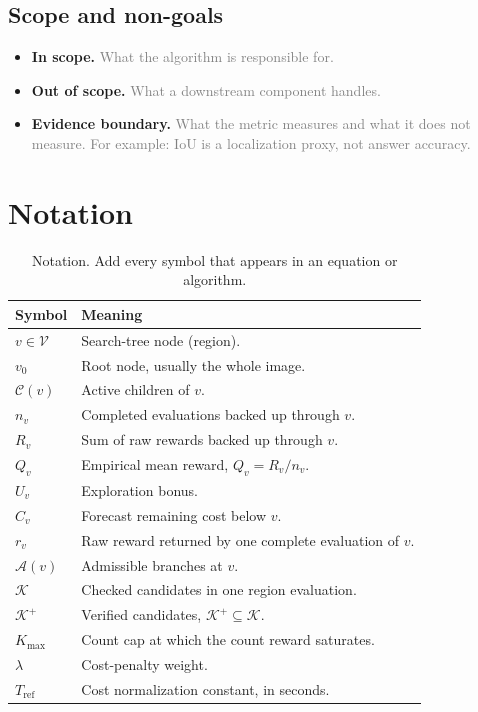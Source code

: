 \documentclass[11pt]{article}
\newcommand{\ph}[1]{\textcolor{gray}{#1}}   %
\newcommand{\set}[1]{\mathcal{#1}}
\begin{document}
\subsection{Scope and non-goals}

\begin{itemize}
  \item \textbf{In scope.} \ph{What the algorithm is responsible for.}
  \item \textbf{Out of scope.} \ph{What a downstream component handles.}
  \item \textbf{Evidence boundary.} \ph{What the metric measures and what it does
  not measure. For example: IoU is a localization proxy, not answer accuracy.}
\end{itemize}

\section{Notation}

\begin{table}[h]
\centering
\small
\begin{tabularx}{\textwidth}{@{}l X@{}}
\toprule
\textbf{Symbol} & \textbf{Meaning} \\
\midrule
$v \in \set{V}$ & Search-tree node (region). \\
$v_0$ & Root node, usually the whole image. \\
$\set{C}(v)$ & Active children of $v$. \\
$n_v$ & Completed evaluations backed up through $v$. \\
$R_v$ & Sum of raw rewards backed up through $v$. \\
$Q_v$ & Empirical mean reward, $Q_v = R_v / n_v$. \\
$U_v$ & Exploration bonus. \\
$C_v$ & Forecast remaining cost below $v$. \\
$r_v$ & Raw reward returned by one complete evaluation of $v$. \\
$\set{A}(v)$ & Admissible branches at $v$. \\
$\set{K}$ & Checked candidates in one region evaluation. \\
$\set{K}^{+}$ & Verified candidates, $\set{K}^{+} \subseteq \set{K}$. \\
$K_{\max}$ & Count cap at which the count reward saturates. \\
$\lambda$ & Cost-penalty weight. \\
$T_{\mathrm{ref}}$ & Cost normalization constant, in seconds. \\
\bottomrule
\end{tabularx}
\caption{Notation. Add every symbol that appears in an equation or algorithm.}
\label{tab:notation}
\end{table}
\end{document}
